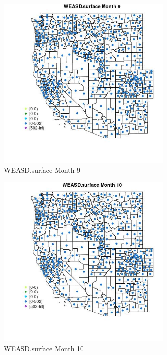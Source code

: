 \begin{figure} 
\centering  
\includegraphics[width=0.77\textwidth]{Code_Outputs/df_report_ML_predictors_CountyCentroid_Locations_Dates_2008-01-01to2018-12-31_MapObsMo9WEASDsurface.jpg} 
\caption{\label{fig:df_report_ML_predictors_CountyCentroid_Locations_Dates_2008-01-01to2018-12-31MapObsMo9WEASDsurface}WEASD.surface Month 9} 
\end{figure} 
 

\begin{figure} 
\centering  
\includegraphics[width=0.77\textwidth]{Code_Outputs/df_report_ML_predictors_CountyCentroid_Locations_Dates_2008-01-01to2018-12-31_MapObsMo10WEASDsurface.jpg} 
\caption{\label{fig:df_report_ML_predictors_CountyCentroid_Locations_Dates_2008-01-01to2018-12-31MapObsMo10WEASDsurface}WEASD.surface Month 10} 
\end{figure} 
 

